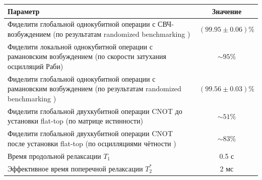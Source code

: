 \begin{center}
	\begin{tabular}{ |p{13cm}| c|}
		\hline
		\textbf{Параметр} & \textbf{Значение} \\
		\hline
		Фиделити глобальной однокубитной операции с СВЧ-возбуждением (по результатам randomized benchmarking \cite{Hines_2023}) & $(99.95 \pm 0.06) \%$ \\
		\hline
		Фиделити локальной однокубитной операции с рамановским возбуждением (по скорости затухания осцилляций Раби) & $\sim 95 \%$ \\
		\hline
		Фиделити глобальной однокубитной операции с рамановским возбуждением (по результатам randomized benchmarking \cite{Hines_2023}) & $(99.56 \pm 0.03) \%$ \\
		\hline
		Фиделити глобальной двухкубитной операции CNOT до установки flat-top (по матрице истинности) & $\sim 51\%$ \\
		\hline
		Фиделити глобальной двухкубитной операции CNOT после установки flat-top (по осцилляциями чётности \cite{parity_oscillations,toffoli}) & $\sim 83\%$ \\
		\hline
		Время продольной релаксации $T_1$  &  0.5 с\\
		Эффективное время поперечной релаксации $T_2^*$ &  2 мс\\
		\hline
	\end{tabular}
	\label{tab:params}
\end{center}
	





\newpage